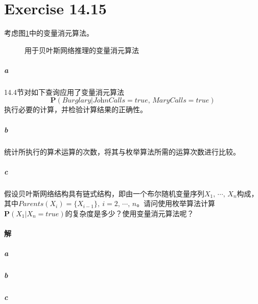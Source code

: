 \documentclass{article}
\begin{document}
\section{Exercise 14.15}
考虑图\ref{14.11}中的变量消元算法。
\begin{figure}
    \centering
    \caption{用于贝叶斯网络推理的变量消元算法}
    \label{14.11}
\end{figure}
\subparagraph{a} 14.4节对如下查询应用了变量消元算法$$\mathbf{P}(\textit{Burglary} | \textit{JohnCalls} = \textit{true},\, \textit{MaryCalls} = \textit{true})$$执行必要的计算，并检验计算结果的正确性。
\subparagraph{b} 统计所执行的算术运算的次数，将其与枚举算法所需的运算次数进行比较。
\subparagraph{c} 假设贝叶斯网络结构具有链式结构，即由一个布尔随机变量序列$X_1,\, \cdots,\, X_n$构成，其中$\textit{Parents}(X_i) = \{X_{i - 1}\},\ i = 2,\, \cdots,\, n$。请问使用枚举算法计算$\mathbf{P}(X_1 | X_n = \textit{true})$的复杂度是多少？使用变量消元算法呢？

\paragraph{解}
\subparagraph{a}
\subparagraph{b}
\subparagraph{c}
\end{document}
